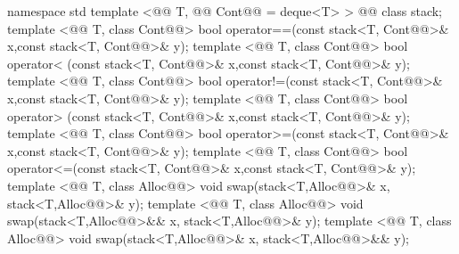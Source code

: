 \documentclass[american,twoside]{book}
\begin{document}
\begin{codeblock}
namespace std {
  template <@@ T, @@ Cont@@ = deque<T> > 
    @@
    class stack;
  template <@@ T, class Cont@@>
    bool operator==(const stack<T, Cont@@>& x,const stack<T, Cont@@>& y);
  template <@@ T, class Cont@@>
    bool operator< (const stack<T, Cont@@>& x,const stack<T, Cont@@>& y);
  template <@@ T, class Cont@@>
    bool operator!=(const stack<T, Cont@@>& x,const stack<T, Cont@@>& y);
  template <@@ T, class Cont@@>
    bool operator> (const stack<T, Cont@@>& x,const stack<T, Cont@@>& y);
  template <@@ T, class Cont@@>
    bool operator>=(const stack<T, Cont@@>& x,const stack<T, Cont@@>& y);
  template <@@ T, class Cont@@>
    bool operator<=(const stack<T, Cont@@>& x,const stack<T, Cont@@>& y);
  template <@@ T, class Alloc@@>
    void swap(stack<T,Alloc@@>& x, stack<T,Alloc@@>& y);
  template <@@ T, class Alloc@@>
    void swap(stack<T,Alloc@@>&& x, stack<T,Alloc@@>& y);
  template <@@ T, class Alloc@@>
    void swap(stack<T,Alloc@@>& x, stack<T,Alloc@@>&& y);
}
\end{codeblock}

%
\end{document}

